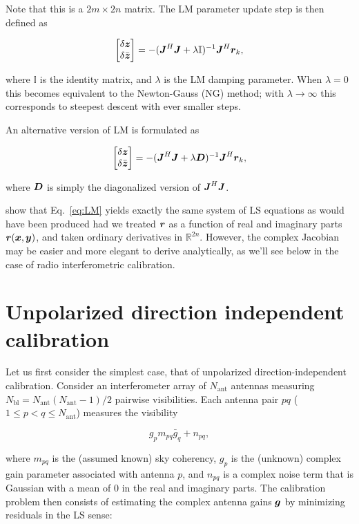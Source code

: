 \documentclass[useAMS,usenatbib]{mn2e}
\newcommand{\REAL}{\mathbb{R}}
\newcommand{\II}{\mathbb{I}}
\newcommand{\zz}{\bmath{z}}
\newcommand{\mat}[1]{{\bmath{#1}}}
\newcommand{\JJ}{\mat{J}} %
\newcommand{\DD}{\mat{D}}
\begin{document}
Note that this is a $2m \times 2n$ matrix. The LM parameter update step is then defined as

\begin{equation}
\label{eq:LM}
\Matrix{c}{\delta \zz \\ \delta \bar{\zz}} = -(\JJ^H \JJ + \lambda\II)^{-1}\JJ^H \bmath{r}_k,
\end{equation}

where $\II$ is the identity matrix, and $\lambda$ is the LM damping parameter. When $\lambda=0$ this becomes 
equivalent to the Newton-Gauss (NG) method; with $\lambda\to\infty$ this corresponds to steepest descent with ever smaller steps.

An alternative version of LM is formulated as

\begin{equation}
\label{eq:LM1}
\Matrix{c}{\delta \zz \\ \delta \bar{\zz}} = -(\JJ^H \JJ + \lambda \DD)^{-1}\JJ^H \bmath{r}_k,
\end{equation}

where $\DD$ is simply the diagonalized version of $\JJ^H\JJ$.

\citet{ComplexOpt} show that Eq.~\ref{eq:LM} yields exactly the same system of LS equations as would have 
been produced had we treated $\bmath{r}$ as a function of real and imaginary parts $\bmath{r}(\bmath{x},\bmath{y})$, 
and taken ordinary derivatives in $\REAL^{2n}$. However, the complex Jacobian may be easier and more elegant 
to derive analytically, as we'll see below in the case of radio interferometric calibration.

\section{Unpolarized direction independent calibration}

\newcommand{\Na}{N_\mathrm{ant}}
\newcommand{\Nbl}{N_\mathrm{bl}}
\newcommand{\Nd}{N_\mathrm{dir}}

Let us first consider the simplest case, that of unpolarized direction-independent calibration. Consider an interferometer
array of $\Na$ antennas measuring $\Nbl=\Na(\Na-1)/2$ pairwise visibilities. Each antenna pair $pq$ ($1\leq p<q\leq \Na$) 
measures the visibility

\begin{equation}
\label{eq:RIME:unpol}
g_p m_{pq} \bar{g}_q + n_{pq},
\end{equation}

where $m_{pq}$ is the (assumed known) sky coherency, $g_p$ is the (unknown) complex gain parameter 
associated with antenna $p$, and $n_{pq}$ is a complex noise term that is Gaussian with a mean of 0 in the real and 
imaginary parts. The calibration problem then consists of estimating the complex antenna gains $\bmath{g}$ by
minimizing residuals in the LS sense:
\end{document}
